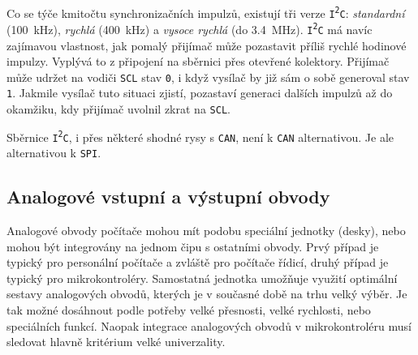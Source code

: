         Co se týče kmitočtu synchronizačních impulzů, existují tři verze 
        \texttt{I{\textsuperscript{2}}C}: \emph{standardní} (\qty{100}{\kilo\hertz}), \emph{rychlá} 
        (\qty{400}{\kilo\hertz}) a \emph{vysoce rychlá} (do \qty{3.4}{\mega\hertz}). 
        \texttt{I{\textsuperscript{2}}C} má navíc zajímavou vlastnost, jak pomalý přijímač může 
        pozastavit příliš rychlé hodinové impulzy. Vyplývá to z připojení na sběrnici přes otevřené 
        kolektory. Přijímač může udržet na vodiči \texttt{SCL} stav \texttt{0}, i když vysílač by 
        již sám o sobě generoval stav \texttt{1}. Jakmile vysílač tuto situaci zjistí, pozastaví 
        generaci dalších impulzů až do okamžiku, kdy přijímač uvolnil zkrat na \texttt{SCL}.
        
        Sběrnice \texttt{I{\textsuperscript{2}}C}, i přes některé shodné rysy s \texttt{CAN}, není 
        k \texttt{CAN} alternativou. Je ale alternativou k \texttt{SPI}. 
        
    \subsection{Analogové vstupní a výstupní obvody}
      Analogové obvody počítače mohou mít podobu speciální jednotky (desky), nebo mohou být 
      integrovány na jednom čipu s ostatními obvody. Prvý případ je typický pro personální počítače 
      a zvláště pro počítače řídicí, druhý případ je typický pro mikrokontroléry. Samostatná 
      jednotka umožňuje využití optimální sestavy analogových obvodů, kterých je v současné době na 
      trhu velký výběr. Je tak možné dosáhnout podle potřeby velké přesnosti, velké rychlosti, nebo 
      speciálních funkcí. Naopak integrace analogových obvodů v mikrokontroléru musí sledovat 
      hlavně kritérium velké univerzality.
      
